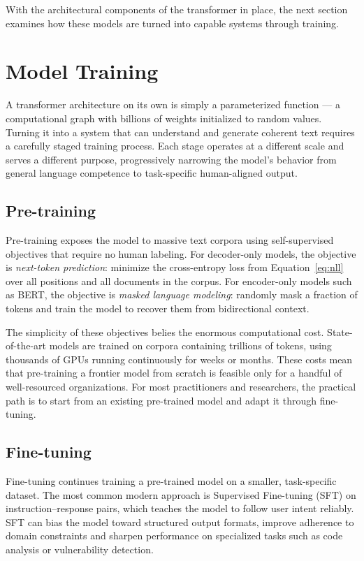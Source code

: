 With the architectural components of the transformer in place, the next section examines how these models are turned into capable systems through training.

\section{Model Training}
\label{sec:training}

A transformer architecture on its own is simply a parameterized function --- a computational graph with billions of weights initialized to random values. Turning it into a system that can understand and generate coherent text requires a carefully staged training process. Each stage operates at a different scale and serves a different purpose, progressively narrowing the model's behavior from general language competence to task-specific human-aligned output.

\subsection{Pre-training}
\label{subsec:pretraining}

Pre-training exposes the model to massive text corpora using self-supervised objectives that require no human labeling. For decoder-only models, the objective is \emph{next-token prediction}: minimize the cross-entropy loss from Equation~\eqref{eq:nll} over all positions and all documents in the corpus. For encoder-only models such as BERT, the objective is \emph{masked language modeling}: randomly mask a fraction of tokens and train the model to recover them from bidirectional context.

The simplicity of these objectives belies the enormous computational cost. State-of-the-art models are trained on corpora containing trillions of tokens, using thousands of GPUs running continuously for weeks or months. These costs mean that pre-training a frontier model from scratch is feasible only for a handful of well-resourced organizations. For most practitioners and researchers, the practical path is to start from an existing pre-trained model and adapt it through fine-tuning.

\subsection{Fine-tuning}
\label{subsec:finetuning}

Fine-tuning continues training a pre-trained model on a smaller, task-specific dataset. The most common modern approach is Supervised Fine-tuning (SFT) on instruction--response pairs, which teaches the model to follow user intent reliably. SFT can bias the model toward structured output formats, improve adherence to domain constraints and sharpen performance on specialized tasks such as code analysis or vulnerability detection.

